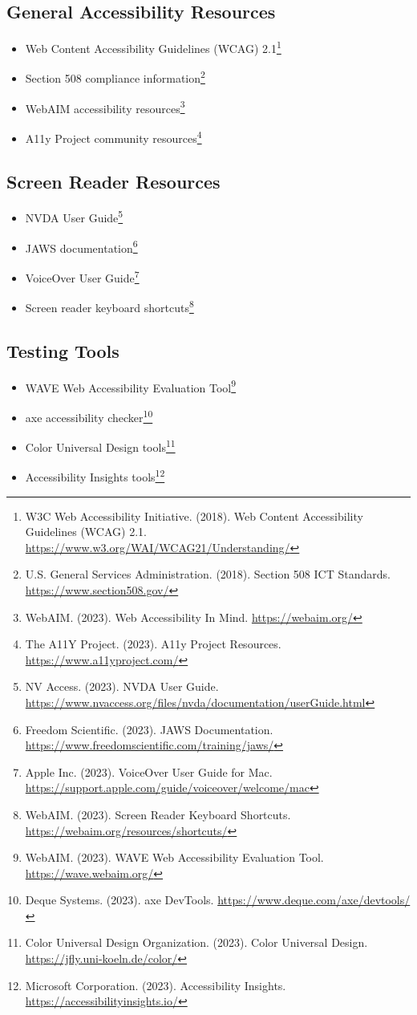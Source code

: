 \subsection{General Accessibility Resources}
\begin{itemize}
\item Web Content Accessibility Guidelines (WCAG) 2.1\footnote{W3C Web Accessibility Initiative. (2018). Web Content Accessibility Guidelines (WCAG) 2.1. \url{https://www.w3.org/WAI/WCAG21/Understanding/}}
\item Section 508 compliance information\footnote{U.S. General Services Administration. (2018). Section 508 ICT Standards. \url{https://www.section508.gov/}}
\item WebAIM accessibility resources\footnote{WebAIM. (2023). Web Accessibility In Mind. \url{https://webaim.org/}}
\item A11y Project community resources\footnote{The A11Y Project. (2023). A11y Project Resources. \url{https://www.a11yproject.com/}}
\end{itemize}

\subsection{Screen Reader Resources}
\begin{itemize}
\item NVDA User Guide\footnote{NV Access. (2023). NVDA User Guide. \url{https://www.nvaccess.org/files/nvda/documentation/userGuide.html}}
\item JAWS documentation\footnote{Freedom Scientific. (2023). JAWS Documentation. \url{https://www.freedomscientific.com/training/jaws/}}
\item VoiceOver User Guide\footnote{Apple Inc. (2023). VoiceOver User Guide for Mac. \url{https://support.apple.com/guide/voiceover/welcome/mac}}
\item Screen reader keyboard shortcuts\footnote{WebAIM. (2023). Screen Reader Keyboard Shortcuts. \url{https://webaim.org/resources/shortcuts/}}
\end{itemize}

\subsection{Testing Tools}
\begin{itemize}
\item WAVE Web Accessibility Evaluation Tool\footnote{WebAIM. (2023). WAVE Web Accessibility Evaluation Tool. \url{https://wave.webaim.org/}}
\item axe accessibility checker\footnote{Deque Systems. (2023). axe DevTools. \url{https://www.deque.com/axe/devtools/}}
\item Color Universal Design tools\footnote{Color Universal Design Organization. (2023). Color Universal Design. \url{https://jfly.uni-koeln.de/color/}}
\item Accessibility Insights tools\footnote{Microsoft Corporation. (2023). Accessibility Insights. \url{https://accessibilityinsights.io/}}
\end{itemize}

